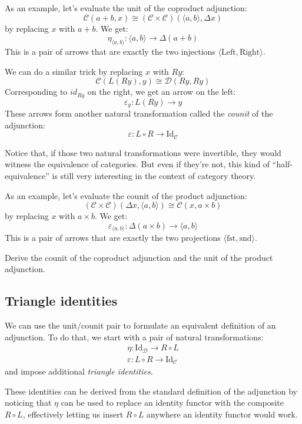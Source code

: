 \documentclass[DaoFP]{subfiles}
\begin{document}
As an example, let's evaluate the unit of the coproduct adjunction:
\[  \mathcal{C} (a + b, x) \cong (\mathcal{C} \times \mathcal{C})( \langle a, b \rangle , \Delta x)\]
by replacing $x$ with $a + b$. We get:
\[ \eta_{\langle a, b \rangle} \colon \langle a, b \rangle \to \Delta(a + b) \]
This is a pair of arrows that are exactly the two injections $\langle \text{Left}, \text{Right} \rangle$.

We can do a similar trick by replacing $x$ with $R y$:
\[  \mathcal{C} (L (R y), y) \cong \mathcal{D}( R y , R y)\]
Corresponding to $id_{R y}$ on the right, we get an arrow on the left:
\[ \varepsilon_y \colon L (R y) \to y \]
These arrows form another natural transformation called the \emph{counit} of the adjunction:
\[ \varepsilon \colon L \circ R \to \text{Id}_{\mathcal{C}}  \]

Notice that, if those two natural transformations were invertible, they would witness the equivalence of categories. But even if they're not, this kind of ``half-equivalence'' is still very interesting in the context of category theory. 

As an example, let's evaluate the counit of the product adjunction:
\[  (\mathcal{C} \times \mathcal{C})( \Delta x,  \langle a, b \rangle ) \cong  \mathcal{C} (x, a \times b)  \]
by replacing $x$ with $a \times b$. We get:
\[ \varepsilon_{\langle a, b \rangle} \colon \Delta (a \times b) \to \langle a, b \rangle \]
This is a pair of arrows that are exactly the two projections $\langle \text{fst}, \text{snd} \rangle$.

\begin{exercise}
Derive the counit of the coproduct adjunction and the unit of the product adjunction.
\end{exercise}

\subsection{Triangle identities}

We can use the unit/counit pair to formulate an equivalent  definition of an adjunction. To do that, we start with a pair of natural transformations:
\begin{align*}
\eta \colon \text{Id}_{\mathcal{D}} \to R \circ L \\
\varepsilon \colon L \circ R \to \text{Id}_{\mathcal{C}} 
\end{align*}
and impose additional \emph{triangle identities}. 

These identities can be derived from the standard definition of the adjunction by noticing that $\eta$ can be used to replace an identity functor with the composite $R \circ L$, effectively letting us insert $R \circ L$ anywhere an identity functor would work.
\end{document}
